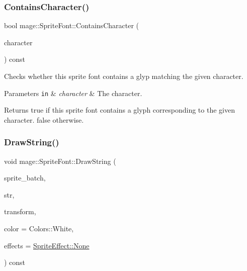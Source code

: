 \subsubsection{\texorpdfstring{Contains\+Character()}{ContainsCharacter()}}
{\footnotesize\ttfamily bool mage\+::\+Sprite\+Font\+::\+Contains\+Character (\begin{DoxyParamCaption}\item[{wchar\+\_\+t}]{character }\end{DoxyParamCaption}) const}

Checks whether this sprite font contains a glyp matching the given character.


\begin{DoxyParams}[1]{Parameters}
\mbox{\tt in}  & {\em character} & The character. \\
\hline
\end{DoxyParams}
\begin{DoxyReturn}{Returns}
{\ttfamily true} if this sprite font contains a glyph corresponding to the given character. {\ttfamily false} otherwise. 
\end{DoxyReturn}
\hypertarget{classmage_1_1_sprite_font_a14b29a1669b3769bd09664b3b1685b43}{}\label{classmage_1_1_sprite_font_a14b29a1669b3769bd09664b3b1685b43} 
\subsubsection{\texorpdfstring{Draw\+String()}{DrawString()}\hspace{0.1cm}{\footnotesize\ttfamily [1/2]}}
{\footnotesize\ttfamily void mage\+::\+Sprite\+Font\+::\+Draw\+String (\begin{DoxyParamCaption}\item[{Sprite\+Batch \&}]{sprite\+\_\+batch,  }\item[{const wchar\+\_\+t $\ast$}]{str,  }\item[{const Sprite\+Transform \&}]{transform,  }\item[{const X\+M\+V\+E\+C\+T\+OR \&}]{color = {\ttfamily Colors\+:\+:White},  }\item[{\hyperlink{namespacemage_a9cfe18123066ba4236f548f9de75d881}{Sprite\+Effect}}]{effects = {\ttfamily \hyperlink{namespacemage_a9cfe18123066ba4236f548f9de75d881a6adf97f83acf6453d4a6a4b1070f3754}{Sprite\+Effect\+::\+None}} }\end{DoxyParamCaption}) const}

